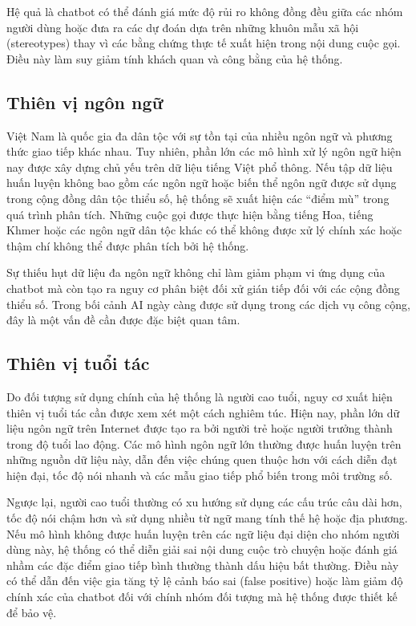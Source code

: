 Hệ quả là chatbot có thể đánh giá mức độ rủi ro không đồng đều giữa các nhóm người dùng hoặc đưa ra các dự đoán dựa trên những khuôn mẫu xã hội (stereotypes) thay vì các bằng chứng thực tế xuất hiện trong nội dung cuộc gọi. Điều này làm suy giảm tính khách quan và công bằng của hệ thống.

\subsection{Thiên vị ngôn ngữ}
Việt Nam là quốc gia đa dân tộc với sự tồn tại của nhiều ngôn ngữ và phương thức giao tiếp khác nhau. Tuy nhiên, phần lớn các mô hình xử lý ngôn ngữ hiện nay được xây dựng chủ yếu trên dữ liệu tiếng Việt phổ thông.
Nếu tập dữ liệu huấn luyện không bao gồm các ngôn ngữ hoặc biến thể ngôn ngữ được sử dụng trong cộng đồng dân tộc thiểu số, hệ thống sẽ xuất hiện các “điểm mù” trong quá trình phân tích. Những cuộc gọi được thực hiện bằng tiếng Hoa, tiếng Khmer hoặc các ngôn ngữ dân tộc khác có thể không được xử lý chính xác hoặc thậm chí không thể được phân tích bởi hệ thống.

Sự thiếu hụt dữ liệu đa ngôn ngữ không chỉ làm giảm phạm vi ứng dụng của chatbot mà còn tạo ra nguy cơ phân biệt đối xử gián tiếp đối với các cộng đồng thiểu số. Trong bối cảnh AI ngày càng được sử dụng trong các dịch vụ công cộng, đây là một vấn đề cần được đặc biệt quan tâm.

\subsection{Thiên vị tuổi tác}
Do đối tượng sử dụng chính của hệ thống là người cao tuổi, nguy cơ xuất hiện thiên vị tuổi tác cần được xem xét một cách nghiêm túc.
Hiện nay, phần lớn dữ liệu ngôn ngữ trên Internet được tạo ra bởi người trẻ hoặc người trưởng thành trong độ tuổi lao động. Các mô hình ngôn ngữ lớn thường được huấn luyện trên những nguồn dữ liệu này, dẫn đến việc chúng quen thuộc hơn với cách diễn đạt hiện đại, tốc độ nói nhanh và các mẫu giao tiếp phổ biến trong môi trường số.

Ngược lại, người cao tuổi thường có xu hướng sử dụng các cấu trúc câu dài hơn, tốc độ nói chậm hơn và sử dụng nhiều từ ngữ mang tính thế hệ hoặc địa phương. Nếu mô hình không được huấn luyện trên các ngữ liệu đại diện cho nhóm người dùng này, hệ thống có thể diễn giải sai nội dung cuộc trò chuyện hoặc đánh giá nhầm các đặc điểm giao tiếp bình thường thành dấu hiệu bất thường.
Điều này có thể dẫn đến việc gia tăng tỷ lệ cảnh báo sai (false positive) hoặc làm giảm độ chính xác của chatbot đối với chính nhóm đối tượng mà hệ thống được thiết kế để bảo vệ.

